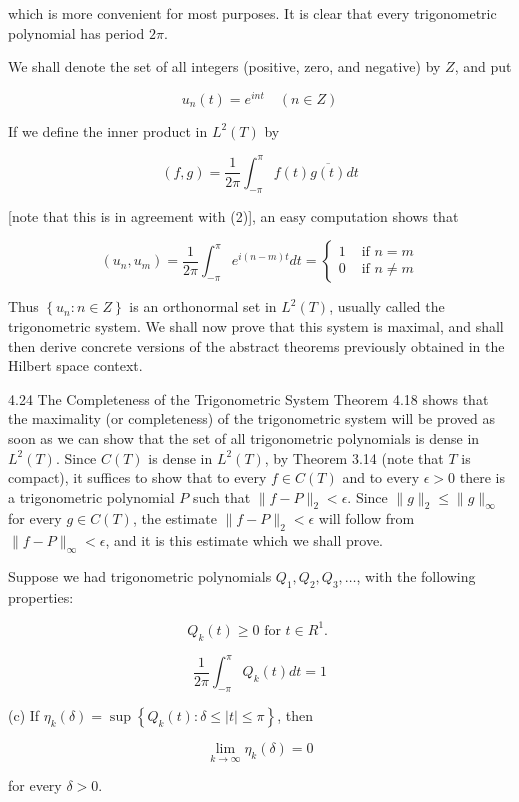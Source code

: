 \documentclass[10pt]{article}
\begin{document}
which is more convenient for most purposes. It is clear that every trigonometric polynomial has period $2 \pi$.

We shall denote the set of all integers (positive, zero, and negative) by $Z$, and put

$$
u_{n}(t)=e^{i n t} \quad(n \in Z)
$$

If we define the inner product in $L^{2}(T)$ by

$$
(f, g)=\frac{1}{2 \pi} \int_{-\pi}^{\pi} f(t) \overline{g(t)} d t
$$

[note that this is in agreement with (2)], an easy computation shows that

$$
\left(u_{n}, u_{m}\right)=\frac{1}{2 \pi} \int_{-\pi}^{\pi} e^{i(n-m) t} d t= \begin{cases}1 & \text { if } n=m \\ 0 & \text { if } n \neq m\end{cases}
$$

Thus $\left\{u_{n}: n \in Z\right\}$ is an orthonormal set in $L^{2}(T)$, usually called the trigonometric system. We shall now prove that this system is maximal, and shall then derive concrete versions of the abstract theorems previously obtained in the Hilbert space context.

4.24 The Completeness of the Trigonometric System Theorem 4.18 shows that the maximality (or completeness) of the trigonometric system will be proved as soon as we can show that the set of all trigonometric polynomials is dense in $L^{2}(T)$. Since $C(T)$ is dense in $L^{2}(T)$, by Theorem 3.14 (note that $T$ is compact), it suffices to show that to every $f \in C(T)$ and to every $\epsilon>0$ there is a trigonometric polynomial $P$ such that $\|f-P\|_{2}<\epsilon$. Since $\|g\|_{2} \leq\|g\|_{\infty}$ for every $g \in C(T)$, the estimate $\|f-P\|_{2}<\epsilon$ will follow from $\|f-P\|_{\infty}<\epsilon$, and it is this estimate which we shall prove.

Suppose we had trigonometric polynomials $Q_{1}, Q_{2}, Q_{3}, \ldots$, with the following properties:

$$
Q_{k}(t) \geq 0 \text { for } t \in R^{1} \text {. }
$$

$$
\frac{1}{2 \pi} \int_{-\pi}^{\pi} Q_{k}(t) d t=1
$$

(c) If $\eta_{k}(\delta)=\sup \left\{Q_{k}(t): \delta \leq|t| \leq \pi\right\}$, then

$$
\lim _{k \rightarrow \infty} \eta_{k}(\delta)=0
$$

for every $\delta>0$.
\end{document}
